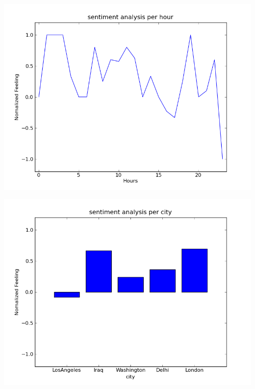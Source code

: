 \documentclass[a4paper,12pt]{report}
\begin{document}
\begin{center}
 \includegraphics[width=13 cm,height=12 cm]{./senti.png}
\end{center}
\begin{center}
 \includegraphics[width=13 cm,height=12 cm]{./place.png}
\end{center}
\end{document}
